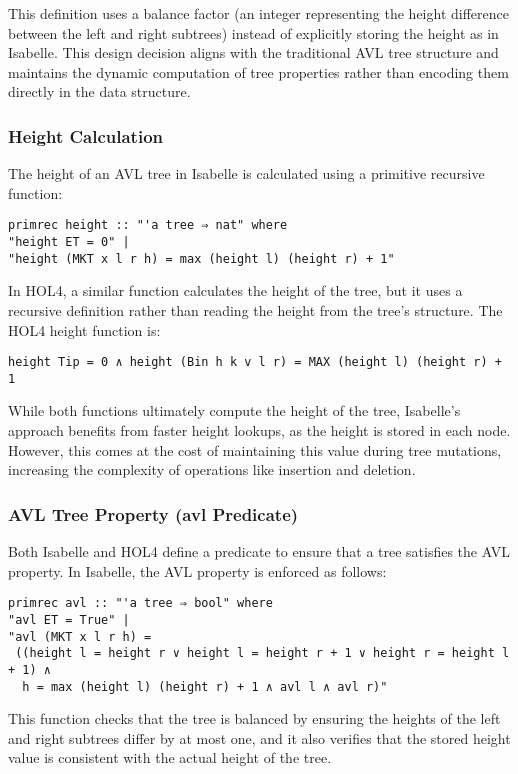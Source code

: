 \documentclass[12pt]{article}
\begin{document}
This definition uses a balance factor (an integer representing the height difference between the left and right subtrees) instead of explicitly storing the height as in Isabelle. This design decision aligns with the traditional AVL tree structure and maintains the dynamic computation of tree properties rather than encoding them directly in the data structure.

\subsubsection{Height Calculation}
The height of an AVL tree in Isabelle is calculated using a primitive recursive function:

\begin{verbatim}
primrec height :: "'a tree ⇒ nat" where
"height ET = 0" |
"height (MKT x l r h) = max (height l) (height r) + 1"
\end{verbatim}

In HOL4, a similar function calculates the height of the tree, but it uses a recursive definition rather than reading the height from the tree’s structure. The HOL4 height function is:

\begin{verbatim}
height Tip = 0 ∧ height (Bin h k v l r) = MAX (height l) (height r) + 1
\end{verbatim}

While both functions ultimately compute the height of the tree, Isabelle’s approach benefits from faster height lookups, as the height is stored in each node. However, this comes at the cost of maintaining this value during tree mutations, increasing the complexity of operations like insertion and deletion.

\subsubsection{AVL Tree Property (avl Predicate)}
Both Isabelle and HOL4 define a predicate to ensure that a tree satisfies the AVL property. In Isabelle, the AVL property is enforced as follows:

\begin{verbatim}
primrec avl :: "'a tree ⇒ bool" where
"avl ET = True" |
"avl (MKT x l r h) =
 ((height l = height r ∨ height l = height r + 1 ∨ height r = height l + 1) ∧ 
  h = max (height l) (height r) + 1 ∧ avl l ∧ avl r)"
\end{verbatim}

This function checks that the tree is balanced by ensuring the heights of the left and right subtrees differ by at most one, and it also verifies that the stored height value is consistent with the actual height of the tree.
\end{document}
